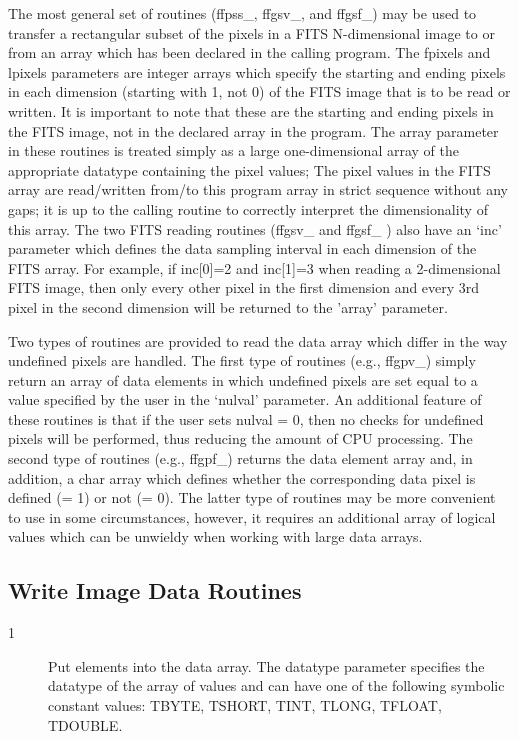 The most general set of routines (ffpss\_, ffgsv\_, and ffgsf\_) may be
used to transfer a rectangular subset of the pixels in a FITS
N-dimensional image to or from an array which has been declared in the
calling program.  The fpixels and lpixels parameters are integer arrays
which specify the starting and ending pixels in each dimension
(starting with 1, not 0) of the FITS image that is to be read or
written.  It is important to note that these are the starting and
ending pixels in the FITS image, not in the declared array in the
program. The array parameter in these routines is treated simply as a
large one-dimensional array of the appropriate datatype containing the
pixel values; The pixel values in the FITS array are read/written
from/to this program array in strict sequence without any gaps;  it is
up to the calling routine to correctly interpret the dimensionality of
this array.  The two FITS reading routines (ffgsv\_ and ffgsf\_ ) also
have an `inc' parameter which defines the data sampling interval in
each dimension of the FITS array.  For example, if inc[0]=2 and
inc[1]=3 when reading a 2-dimensional FITS image, then only every other
pixel in the first dimension and every 3rd pixel in the second
dimension will be returned to the 'array' parameter.

Two types of routines are provided to read the data array which differ
in the way undefined pixels are handled.  The first type of routines
(e.g., ffgpv\_) simply return an array of data elements in which
undefined pixels are set equal to a value specified by the user in the
`nulval' parameter.  An additional feature of these routines is that if
the user sets nulval = 0, then no checks for undefined pixels will be
performed, thus reducing the amount of CPU processing.  The second type
of routines (e.g., ffgpf\_) returns the data element array and, in
addition, a char array which defines whether the corresponding data
pixel is defined (= 1) or not (= 0).  The latter type of routines may
be more convenient to use in some circumstances, however, it requires
an additional array of logical values which can be unwieldy when
working with large data arrays.


\subsection{Write Image Data Routines \label{FFPPR}}

\begin{description}
\item[1 ] Put elements into the data array. The datatype parameter specifies
    the datatype of the array of values and can have one of the following
   symbolic constant values: TBYTE, TSHORT, TINT, TLONG, TFLOAT, TDOUBLE.
\end{description}

